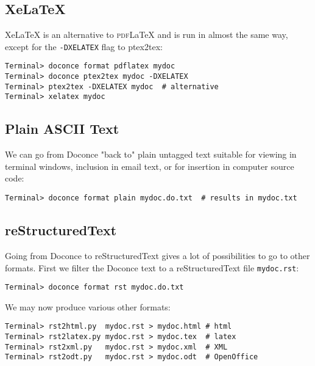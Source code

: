 \documentclass[%
oneside,                 %
final,                   %
10pt]{article}
\begin{document}
{{\subsection{XeLaTeX}

XeLaTeX is an alternative to \textsc{pdf}{\LaTeX} and is run in almost the
same way, except for the {\fontsize{10pt}{10pt}\Verb!-DXELATEX!} flag to ptex2tex:

\begin{Verbatim}[fontsize=\fontsize{9pt}{9pt},tabsize=8,baselinestretch=0.85,fontfamily=tt,xleftmargin=7mm]
Terminal> doconce format pdflatex mydoc
Terminal> doconce ptex2tex mydoc -DXELATEX
Terminal> ptex2tex -DXELATEX mydoc  # alternative
Terminal> xelatex mydoc
\end{Verbatim}
\noindent


\subsection{Plain ASCII Text}

We can go from Doconce "back to" plain untagged text suitable for viewing
in terminal windows, inclusion in email text, or for insertion in
computer source code:
\vspace{4pt}
\begin{Verbatim}[numbers=none,frame=lines,fontsize=\fontsize{9pt}{9pt},labelposition=topline,framesep=2.5mm,framerule=0.7pt]
Terminal> doconce format plain mydoc.do.txt  # results in mydoc.txt
\end{Verbatim}

\subsection{reStructuredText}

Going from Doconce to reStructuredText gives a lot of possibilities to
go to other formats. First we filter the Doconce text to a
reStructuredText file {\fontsize{10pt}{10pt}\Verb!mydoc.rst!}:
\vspace{4pt}
\begin{Verbatim}[numbers=none,frame=lines,fontsize=\fontsize{9pt}{9pt},labelposition=topline,framesep=2.5mm,framerule=0.7pt]
Terminal> doconce format rst mydoc.do.txt
\end{Verbatim}
We may now produce various other formats:
\vspace{4pt}
\begin{Verbatim}[numbers=none,frame=lines,fontsize=\fontsize{9pt}{9pt},labelposition=topline,framesep=2.5mm,framerule=0.7pt]
Terminal> rst2html.py  mydoc.rst > mydoc.html # html
Terminal> rst2latex.py mydoc.rst > mydoc.tex  # latex
Terminal> rst2xml.py   mydoc.rst > mydoc.xml  # XML
Terminal> rst2odt.py   mydoc.rst > mydoc.odt  # OpenOffice
\end{Verbatim}

}}
\end{document}

